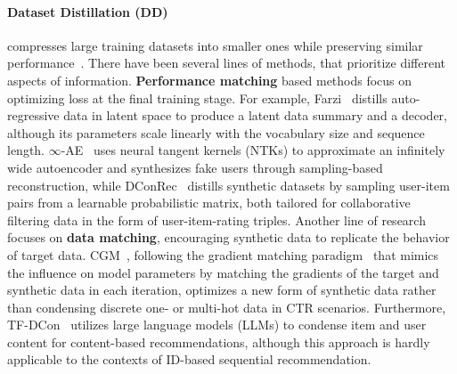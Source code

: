 \paragraph{Dataset Distillation (DD)} compresses large training datasets into smaller ones while preserving similar performance~\cite{maekawa2024dilm, gu2024efficient}. There have been several lines of methods, that prioritize different aspects of information. \textbf{Performance matching} based methods focus on optimizing loss at the final training stage. For example, Farzi~\cite{sachdeva2023farzi} distills auto-regressive data in latent space to produce a latent data summary and a decoder, although its parameters scale linearly with the vocabulary size and sequence length. $\infty$-AE~\cite{sachdeva2022infinite} uses neural tangent kernels (NTKs) to approximate an infinitely wide autoencoder and synthesizes fake users through sampling-based reconstruction, while DConRec~\cite{wu2023dataset} distills synthetic datasets by sampling user-item pairs from a learnable probabilistic matrix, both tailored for collaborative filtering data in the form of user-item-rating triples. Another line of research focuses on \textbf{data matching}, encouraging synthetic data to replicate the behavior of target data. CGM~\cite{wang2023gradient}, following the gradient matching paradigm~\cite{zhao2020dataset} that mimics the influence on model parameters by matching the gradients of the target and synthetic data in each iteration, optimizes a new form of synthetic data rather than condensing discrete one- or multi-hot data in CTR scenarios. Furthermore, TF-DCon~\cite{wu2023leveraging} utilizes large language models (LLMs) to condense item and user content for content-based recommendations, although this approach is hardly applicable to the contexts of ID-based sequential recommendation.




